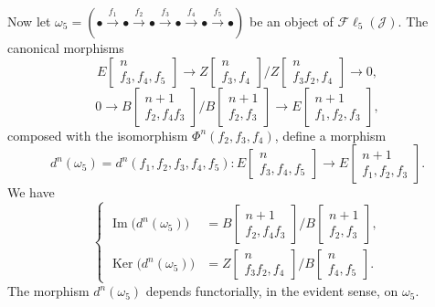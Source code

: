Now let
$\omega_5=(\mathord\bullet\xrightarrow{f_1}\mathord\bullet
\xrightarrow{f_2}\mathord\bullet\xrightarrow{f_3}\mathord\bullet
\xrightarrow{f_4}\mathord\bullet\xrightarrow{f_5}\mathord\bullet)$
be an object of $\mathcal{F}\ell_5(\mathcal J)$. The canonical morphisms
\[
E\!\begin{bmatrix}n\\ f_3,f_4,f_5\end{bmatrix}
\longrightarrow
Z\!\begin{bmatrix}n\\ f_3,f_4\end{bmatrix}
 \Big/
Z\!\begin{bmatrix}n\\ f_3f_2,f_4\end{bmatrix}
\longrightarrow0,
\]
\[
0\longrightarrow
B\!\begin{bmatrix}n+1\\ f_2,f_4f_3\end{bmatrix}
 \Big/
B\!\begin{bmatrix}n+1\\ f_2,f_3\end{bmatrix}
\longrightarrow
E\!\begin{bmatrix}n+1\\ f_1,f_2,f_3\end{bmatrix},
\]
composed with the isomorphism $\Phi^n(f_2,f_3,f_4)$, define a morphism
\[
d^n(\omega_5)=d^n(f_1,f_2,f_3,f_4,f_5)\colon
E\!\begin{bmatrix}n\\ f_3,f_4,f_5\end{bmatrix}
\longrightarrow
E\!\begin{bmatrix}n+1\\ f_1,f_2,f_3\end{bmatrix}.
\tag{4.2.3.2}
\]
We have
\[
\left\{
\begin{aligned}
\operatorname{Im}\bigl(d^n(\omega_5)\bigr)
 &=B\!\begin{bmatrix}n+1\\ f_2,f_4f_3\end{bmatrix}
   \Big/
   B\!\begin{bmatrix}n+1\\ f_2,f_3\end{bmatrix},\\[2pt]
\operatorname{Ker}\bigl(d^n(\omega_5)\bigr)
 &=Z\!\begin{bmatrix}n\\ f_3f_2,f_4\end{bmatrix}
   \Big/
   B\!\begin{bmatrix}n\\ f_4,f_5\end{bmatrix}.
\end{aligned}
\right.
\tag{4.2.3.3}
\]
The morphism $d^n(\omega_5)$ depends functorially, in the evident sense, on
$\omega_5$.

